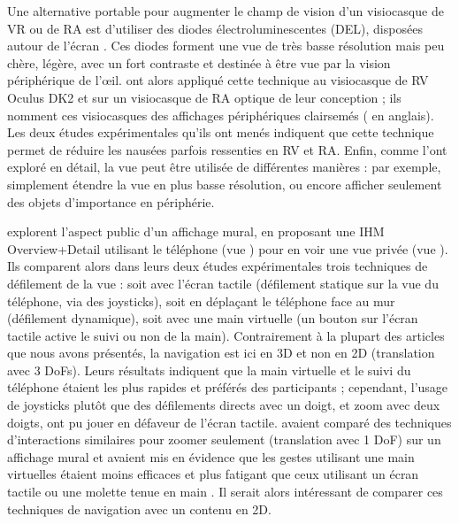 Une alternative portable pour augmenter le champ de vision d'un visiocasque de VR ou de RA est d'utiliser des diodes électroluminescentes (DEL), disposées autour de l'écran . Ces diodes forment une vue  de très basse résolution mais peu chère, légère, avec un fort contraste et destinée à être vue par la vision périphérique de l'\oe il. \cite{Xiao2016} ont alors appliqué cette technique au visiocasque de RV Oculus DK2 et sur un visiocasque de RA optique de leur conception ; ils nomment ces visiocasques des affichages périphériques clairsemés ( en anglais). Les deux études expérimentales qu'ils ont menés indiquent que cette technique permet de réduire les nausées parfois ressenties en RV et RA. Enfin, comme \cite{Jones2013} l'ont exploré en détail, la vue  peut être utilisée de différentes manières : par exemple, simplement étendre la vue  en plus basse résolution, ou encore afficher seulement des objets d'importance en périphérie.



\cite{Berge2014} explorent l'aspect public d'un affichage mural, en proposant une IHM Overview+Detail utilisant le téléphone (vue ) pour en voir une vue privée (vue ). Ils comparent alors dans leurs deux études expérimentales trois techniques de défilement de la vue   : soit avec l'écran tactile (défilement statique sur la vue du téléphone, via des joysticks), soit en déplaçant le téléphone face au mur (défilement dynamique), soit avec une main virtuelle (un bouton sur l'écran tactile active le suivi ou non de la main). Contrairement à la plupart des articles que nous avons présentés, la navigation est ici en 3D et non en 2D (translation avec 3 DoFs). Leurs résultats indiquent que la main virtuelle et le suivi du téléphone étaient les plus rapides et préférés des participants ; cependant, l'usage de joysticks plutôt que des défilements directs avec un doigt, et zoom avec deux doigts, ont pu jouer en défaveur de l'écran tactile. \cite{Nancel2011} avaient comparé des techniques d'interactions similaires pour zoomer seulement (translation avec 1 DoF) sur un affichage mural et avaient mis en évidence que les gestes utilisant une main virtuelles étaient moins efficaces et plus fatigant que ceux utilisant un écran tactile ou une molette tenue en main . Il serait alors intéressant de comparer ces techniques de navigation avec un contenu en 2D.

